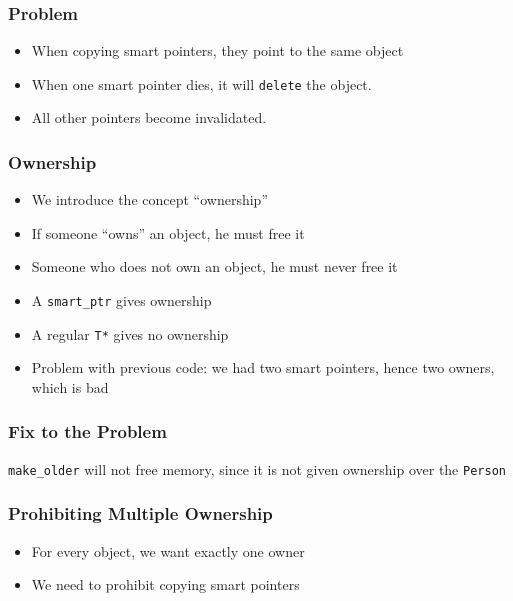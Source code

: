 \begin{frame}
  \frametitle{Problem}
  \begin{center}
  \end{center}
  \begin{itemize}
    \item When copying smart pointers, they point to the same object
    \item When one smart pointer dies, it will {\tt delete} the object.
    \item All other pointers become invalidated.
  \end{itemize}
\end{frame}

\begin{frame}
  \frametitle{Ownership}
  \begin{itemize}
    \item We introduce the concept ``ownership''
    \item If someone ``owns'' an object, he must free it
    \item Someone who does not own an object, he must never free it
    \item A {\tt smart\_ptr} gives ownership
    \item A regular {\tt T*} gives no ownership
    \item Problem with previous code: we had two smart pointers, hence two owners, which is bad
  \end{itemize}
\end{frame}

\begin{frame}
  \frametitle{Fix to the Problem}
  \begin{center}
    \texttt{make\_older} will not free memory, since it is not given ownership over the \texttt{Person}
  \end{center}
\end{frame}

\begin{frame}
  \frametitle{Prohibiting Multiple Ownership}
  \begin{itemize}
    \item For every object, we want exactly one owner
    \item We need to prohibit copying smart pointers
  \end{itemize}
\end{frame}

